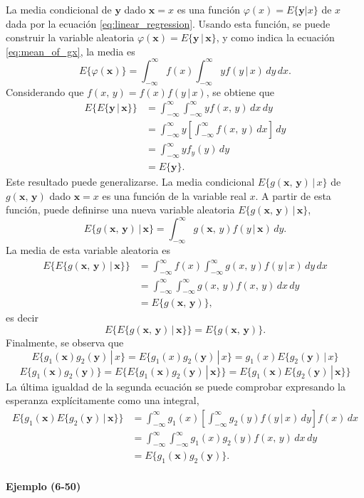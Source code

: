 \documentclass[a4paper]{report}
\newcommand{\x}{\mathbf{x}}
\newcommand{\y}{\mathbf{y}}
\begin{document}
La media condicional de \(\y\) dado \(\x=x\) es una función \(\varphi(x)=E\{\y|x\}\) de \(x\) dada por la ecuación \ref{eq:linear_regression}. Usando esta función, se puede construir la variable aleatoria \(\varphi(\x)=E\{\y\,|\,\x\}\), y como indica la ecuación \ref{eq:mean_of_gx}, la media es
\[
 E\{\varphi(\x)\}=\int_{-\infty}^{\infty}f(x)\int_{-\infty}^{\infty}yf(y\,|\,x)\,dy\,dx.
\]
Considerando que \(f(x,\,y)=f(x)f(y\,|\,x)\), se obtiene que
\begin{align*}
 E\{E\{\y\,|\,\x\}\}&=\int_{-\infty}^{\infty}\int_{-\infty}^{\infty}yf(x,\,y)\,dx\,dy\\
   &=\int_{-\infty}^{\infty}y\left[\int_{-\infty}^{\infty}f(x,\,y)\,dx\right]\,dy\\
   &=\int_{-\infty}^{\infty}yf_y(y)\,dy\\
   &=E\{\y\}.
\end{align*}
Este resultado puede generalizarse. La media condicional \(E\{g(\x,\,\y)\,|\,x\}\) de \(g(\x,\,\y)\) dado \(\x=x\) es una función de la variable real \(x\). A partir de esta función, puede definirse una nueva variable aleatoria \(E\{g(\x,\,\y)\,|\,\x\}\),
\[
 E\{g(\x,\,\y)\,|\,\x\}=\int_{-\infty}^{\infty}g(\x,\,y)f(y\,|\,\x)\,dy.
\]
La media de esta variable aleatoria es
\begin{align*}
 E\{E\{g(\x,\,\y)\,|\,\x\}\}&=\int_{-\infty}^{\infty}f(x)\int_{-\infty}^{\infty}g(x,\,y)f(y\,|\,x)\,dy\,dx\\
   &=\int_{-\infty}^{\infty}\int_{-\infty}^{\infty}g(x,\,y)f(x,\,y)\,dx\,dy\\
   &=E\{g(\x,\,\y)\},
\end{align*}
es decir
\[
 E\{E\{g(\x,\,\y)\,|\,\x\}\}=E\{g(\x,\,\y)\}.
\]
Finalmente, se observa que
\[
 E\{g_1(\x)g_2(\y)\,|\,x\}=E\{g_1(x)g_2(\y)\,|\,x\}=g_1(x)E\{g_2(\y)\,|\,x\}
\]
\[
 E\{g_1(\x)g_2(\y)\}=E\{E\{g_1(\x)g_2(\y)\,|\,\x\}\}=E\{g_1(\x)E\{g_2(\y)\,|\,\x\}\}
\]
La última igualdad de la segunda ecuación se puede comprobar expresando la esperanza explícitamente como una integral,
\begin{align*}
 E\{g_1(\x)E\{g_2(\y)\,|\,\x\}\}&=\int_{-\infty}^{\infty}g_1(x)\left[\int_{-\infty}^{\infty}g_2(y)f(y\,|\,x)\,dy\right]f(x)\,dx\\
  &=\int_{-\infty}^{\infty}\int_{-\infty}^{\infty}g_1(x)g_2(y)f(x,\,y)\,dx\,dy\\
  &=E\{g_1(\x)g_2(\y)\}.
\end{align*}

\paragraph{Ejemplo (6-50)}
\end{document}
